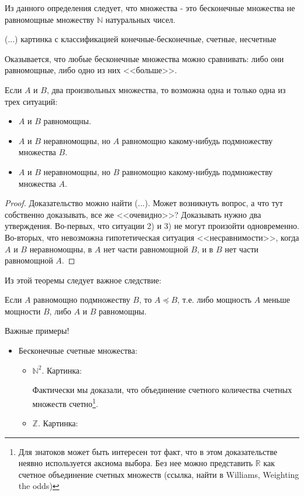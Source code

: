 {Из данного определения следует, что   множества - это бесконечные множества не равномощные множеству $\mathbb{N}$ натуральных чисел.

(...) картинка с классификацией конечные-бесконечные, счетные, несчетные

Оказывается, что любые бесконечные множества можно сравнивать: либо они равномощные, либо одно из них <<больше>>.

\begin{myth} Если $A$ и $B$, два произвольных множества, то возможна одна и только одна из трех ситуаций:
\begin{itemize}
\item[1.] $A$ и $B$ равномощны.
\item[2.] $A$ и $B$ неравномощны, но $A$ равномощно какому-нибудь подмножеству множества $B$.
\item[3.] $A$ и $B$ неравномощны, но $B$ равномощно какому-нибудь подмножеству множества $A$.
\end{itemize}
\end{myth}
\begin{proof} Доказательство можно найти (...). Может возникнуть вопрос, а что тут собственно доказывать, все же <<очевидно>>? Доказывать нужно два утверждения. Во-первых, что ситуации 2) и 3) не могут произойти одновременно. Во-вторых, что невозможна гипотетическая ситуация <<несравнимости>>, когда $A$ и $B$ неравномощны, в $A$ нет части равномощной $B$, и в $B$ нет части равномощной $A$.
\end{proof}

Из этой теоремы следует важное следствие:

\begin{myth}
Если $ A $ равномощно подмножеству $ B $, то $ A\preceq B $, т.е. либо мощность $ A$ меньше мощности $ B $, либо $ A $ и $ B $ равномощны.
\end{myth}



Важные примеры!

\begin{itemize}
\item Бесконечные счетные множества:

\begin{itemize}
\item $\mathbb{N}^{2}$. Картинка:

Фактически мы доказали, что объединение счетного количества счетных множеств счетно\footnote{Для знатоков может быть интересен тот факт, что в этом доказательстве неявно используется аксиома выбора. Без нее можно представить $\mathbb{R}$ как счетное объединение счетных множеств (ссылка, найти в Williams, Weighting the odds) }.
\item $\mathbb{Z}$. Картинка:


\end{itemize}
\end{itemize}}
